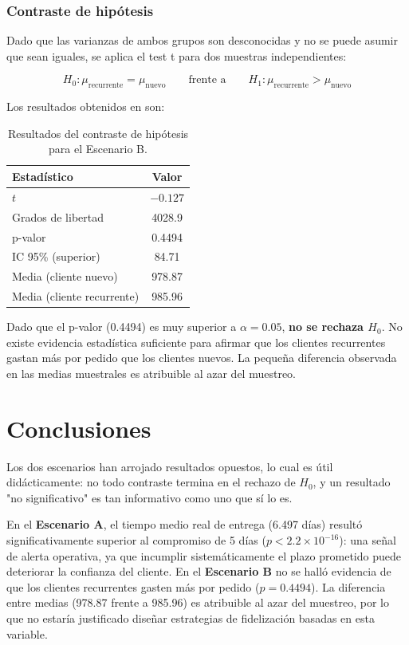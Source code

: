 \documentclass[11pt, a4paper]{article}
\begin{document}
\subsubsection{Contraste de hipótesis}

Dado que las varianzas de ambos grupos son desconocidas y no se puede asumir que sean 
iguales, se aplica el test t para dos muestras independientes:

\[
H_0: \mu_{\text{recurrente}} = \mu_{\text{nuevo}} \qquad \text{frente a} \qquad H_1: \mu_{\text{recurrente}} > \mu_{\text{nuevo}}
\]

Los resultados obtenidos en son:

\begin{table}[H]
\centering
\begin{tabular}{lc}
\toprule
Estadístico & Valor \\
\midrule
$t$ & $-0.127$ \\
Grados de libertad  & 4028.9 \\
p-valor & 0.4494 \\
IC 95\% (superior) & 84.71 \\
Media (cliente nuevo) & 978.87 \\
Media (cliente recurrente) & 985.96 \\
\bottomrule
\end{tabular}
\caption{Resultados del contraste de hipótesis para el Escenario B.}
\label{tab:test_gasto}
\end{table}

Dado que el p-valor (0.4494) es muy superior a $\alpha = 0.05$, \textbf{no se rechaza $H_0$}. 
No existe evidencia estadística suficiente para afirmar que los clientes recurrentes gastan 
más por pedido que los clientes nuevos. La pequeña diferencia observada en las medias 
muestrales es atribuible al azar del muestreo.

\section{Conclusiones}

Los dos escenarios han arrojado resultados opuestos, lo cual es útil didácticamente: no todo 
contraste termina en el rechazo de $H_0$, y un resultado "no significativo" es tan 
informativo como uno que sí lo es.

En el \textbf{Escenario A}, el tiempo medio real de entrega (6.497 días) resultó 
significativamente superior al compromiso de 5 días ($p < 2.2 \times 10^{-16}$): una señal 
de alerta operativa, ya que incumplir sistemáticamente el plazo prometido puede deteriorar 
la confianza del cliente. En el \textbf{Escenario B} no se halló evidencia de que los 
clientes recurrentes gasten más por pedido ($p = 0.4494$). La diferencia entre medias 
(978.87 frente a 985.96) es atribuible al azar del muestreo, por lo que no estaría 
justificado diseñar estrategias de fidelización basadas en esta variable.
\end{document}
